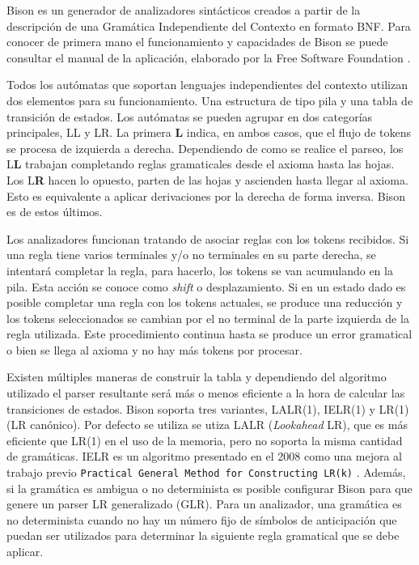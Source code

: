 Bison es un generador de analizadores sintácticos creados a partir de la descripción de una Gramática Independiente del Contexto en formato BNF. Para conocer de primera mano el funcionamiento y capacidades de Bison se puede consultar el manual de la aplicación, elaborado por la Free Software Foundation
\cite{fsf_web_bisonManual}.

\label{automatas-pila} Todos los autómatas que soportan lenguajes independientes del contexto utilizan dos elementos para su funcionamiento. Una estructura de tipo pila y una tabla de transición de estados. Los autómatas se pueden agrupar en dos categorías principales, LL y LR. La primera \textbf{L} indica, en ambos casos, que el flujo de tokens se procesa de izquierda a derecha. Dependiendo de como se realice el parseo, los L\textbf{L} trabajan completando reglas gramaticales desde el axioma hasta las hojas. Los L\textbf{R} hacen lo opuesto, parten de las hojas y ascienden hasta llegar al axioma. Esto es equivalente a aplicar derivaciones por la derecha de forma inversa. Bison es de estos últimos.

Los analizadores funcionan tratando de asociar reglas con los tokens recibidos. Si una regla tiene varios terminales y/o no terminales en su parte derecha, se intentará completar la regla, para hacerlo, los tokens se van acumulando en la pila. Esta acción se conoce como \emph{shift} o desplazamiento. Si en un estado dado es posible completar una regla con los tokens actuales, se produce una reducción y los tokens seleccionados se cambian por el no terminal de la parte izquierda de la regla utilizada. Este procedimiento continua hasta se produce un error gramatical o bien se llega al axioma y no hay más tokens por procesar.

Existen múltiples maneras de construir la tabla y dependiendo del algoritmo utilizado el parser resultante será más o menos eficiente a la hora de calcular las transiciones de estados. Bison soporta tres variantes, LALR(1), IELR(1) y LR(1) (LR canónico). Por defecto se utiliza se utiza LALR (\emph{Lookahead} LR), que es más eficiente que LR(1) en el uso de la memoria, pero no soporta la misma cantidad de gramáticas. IELR es un algoritmo presentado en el 2008 \cite{dennyMalloy_paper_IELRAlgorithm} como una mejora al trabajo previo \texttt{Practical General Method for Constructing LR(k)} \cite{pager_paper_constructLRparsers}. Además, si la gramática es ambigua o no determinista es posible configurar Bison para que genere un parser LR generalizado (GLR). Para un analizador, una gramática es no determinista cuando no hay un número fijo de símbolos de anticipación que puedan ser utilizados para determinar la siguiente regla gramatical que se debe aplicar.


